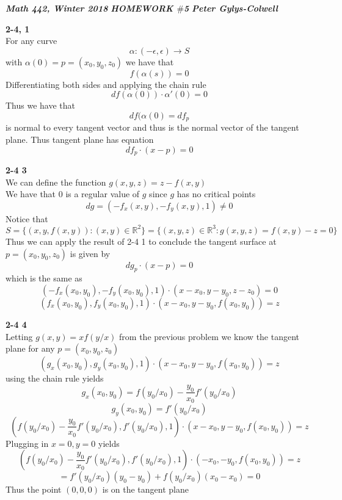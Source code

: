 \documentclass[12pt]{article}
\newenvironment{ques}[1]{\textbf{#1}\vspace{1 mm}\\ }{\bigskip}
\theoremstyle{definition}
\newcommand{\R}{\mathbb R}
\renewcommand{\a}{\alpha}
\begin{document}
\noindent \textit{\textbf{Math 442, Winter 2018}} \hspace{1.3cm}
\textit{\textbf{HOMEWORK $\#$5}} \hspace{1.3cm} \textit{\textbf{Peter
Gylys-Colwell}} 

\vspace{1cm}

\begin{ques}{2-4, 1}
	For any curve
	$$\a:(-\epsilon, \epsilon) \to S$$
	with $\a(0) = p = (x_0,y_0,z_0)$ we have that
	$$f(\a(s)) = 0$$
	Differentiating both sides and applying the chain rule
	$$df(\a(0))\cdot \a'(0)=0$$
	Thus we have that 
	$$df(\a(0) = df_p$$
	is normal to every tangent vector and thus is the normal vector of the
	tangent plane. Thus tangent plane has equation
	$$df_p \cdot (x - p) = 0$$
\end{ques}

\begin{ques}{2-4 3}
	We can define the function $g(x,y,z) = z - f(x,y)$\\
	We have that $0$ is a regular value of $g$ since $g$ has no critical points
	$$dg = (-f_x(x,y), -f_y(x,y), 1) \neq 0$$
	Notice that 
	$$S = \{(x,y,f(x,y)): (x,y) \in \R^2\} = \{(x,y,z) \in \R^3: g(x,y,z) =
	f(x,y) - z = 0\}$$
	Thus we can apply the result of 2-4 1 to conclude the tangent surface at $p
	= (x_0,y_0,z_0)$ is given by
	$$dg_p \cdot (x - p) = 0$$
	which is the same as
	$$(-f_{x}(x_0,y_0), -f_{y}(x_0,y_0), 1) \cdot (x - x_0,y - y_0,z - z_0) = 0$$
	$$(f_{x}(x_0,y_0), f_{y}(x_0,y_0), 1) \cdot (x - x_0,y - y_0, f(x_0,y_0)) = z$$
\end{ques}

\begin{ques}{2-4 4}
	Letting $g(x,y) = xf(y/x)$ from the previous problem we know the tangent
	plane for any $p = (x_0, y_0, z_0)$
	$$(g_{x}(x_0,y_0), g_{y}(x_0,y_0), 1) \cdot (x - x_0,y - y_0, f(x_0,y_0)) = z$$
	using the chain rule yields
	$$g_x(x_0,y_0) = f(y_0/x_0) - \frac {y_0} {x_0} f'(y_0/x_0)$$
	$$g_y(x_0,y_0) = f'(y_0/x_0)$$
	$$(f(y_0/x_0) - \frac {y_0} {x_0} f'(y_0/x_0), f'(y_0/x_0), 1) \cdot (x - x_0,y
	- y_0, f(x_0,y_0)) = z$$
	Plugging in $x=0,y = 0$ yields
	$$(f(y_0/x_0) - \frac {y_0} {x_0} f'(y_0/x_0), f'(y_0/x_0), 1) \cdot (- x_0,
	- y_0, f(x_0,y_0)) = z$$
	$$= f'(y_0/x_0)(y_0-y_0) + f(y_0/x_0)(x_0 - x_0) = 0$$
	Thus the point $(0,0,0)$ is on the tangent plane
\end{ques}
\end{document}
